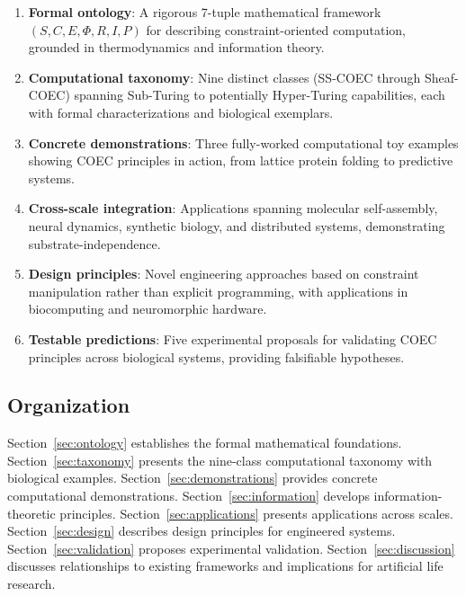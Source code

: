 \documentclass[11pt]{article}
\begin{document}
\begin{enumerate}
\item \textbf{Formal ontology}: A rigorous 7-tuple mathematical framework $(S, C, E, \Phi, R, I, P)$ for describing constraint-oriented computation, grounded in thermodynamics and information theory.

\item \textbf{Computational taxonomy}: Nine distinct classes (SS-COEC through Sheaf-COEC) spanning Sub-Turing to potentially Hyper-Turing capabilities, each with formal characterizations and biological exemplars.

\item \textbf{Concrete demonstrations}: Three fully-worked computational toy examples showing COEC principles in action, from lattice protein folding to predictive systems.

\item \textbf{Cross-scale integration}: Applications spanning molecular self-assembly, neural dynamics, synthetic biology, and distributed systems, demonstrating substrate-independence.

\item \textbf{Design principles}: Novel engineering approaches based on constraint manipulation rather than explicit programming, with applications in biocomputing and neuromorphic hardware.

\item \textbf{Testable predictions}: Five experimental proposals for validating COEC principles across biological systems, providing falsifiable hypotheses.
\end{enumerate}

\subsection{Organization}

Section~\ref{sec:ontology} establishes the formal mathematical foundations. Section~\ref{sec:taxonomy} presents the nine-class computational taxonomy with biological examples. Section~\ref{sec:demonstrations} provides concrete computational demonstrations. Section~\ref{sec:information} develops information-theoretic principles. Section~\ref{sec:applications} presents applications across scales. Section~\ref{sec:design} describes design principles for engineered systems. Section~\ref{sec:validation} proposes experimental validation. Section~\ref{sec:discussion} discusses relationships to existing frameworks and implications for artificial life research.
\end{document}
